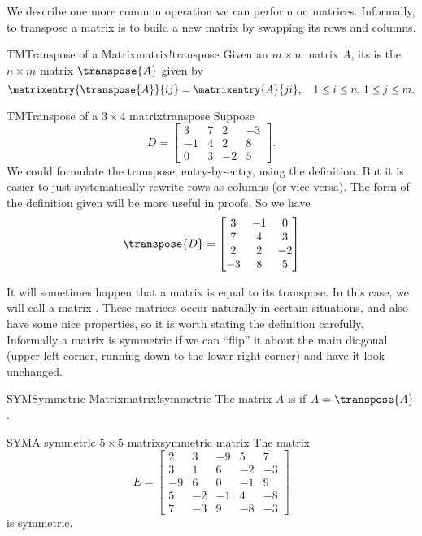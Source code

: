%
%
We describe one more common operation we can perform on matrices.  Informally, to transpose a matrix is to build a new matrix by swapping its rows and columns.
%
\begin{definition}{TM}{Transpose of a Matrix}{matrix!transpose}
Given an $m\times n$ matrix $A$, its  is the $n\times m$ matrix $\transpose{A}$ given by
%
\begin{equation*}
\matrixentry{\transpose{A}}{ij}=\matrixentry{A}{ji},\quad 1\leq i\leq n,\,1\leq j\leq m.
\end{equation*}
%
\end{definition}
%
\begin{example}{TM}{Transpose of a $3\times 4$ matrix}{transpose}
Suppose
%
\begin{equation*}
D=
\begin{bmatrix}
3&7&2&-3\\
-1&4&2&8\\
0&3&-2&5
\end{bmatrix}.
\end{equation*}
%
We could formulate the transpose, entry-by-entry, using the definition.  But it is easier to just systematically rewrite rows as columns (or vice-versa).  The form of the definition given will be more useful in proofs.  So we have
%
\begin{equation*}
\transpose{D}=
\begin{bmatrix}
3&-1&0\\
7&4&3\\
2&2&-2\\
-3&8&5
\end{bmatrix}
\end{equation*}
%
\end{example}
%
It will sometimes happen that a matrix is equal to its transpose.  In this case, we will call a matrix .  These matrices occur naturally in certain situations, and also have some nice properties, so it is worth stating the definition carefully.  Informally a matrix is symmetric if we can ``flip'' it about the main diagonal (upper-left corner, running down to the lower-right corner) and have it look unchanged.
%
\begin{definition}{SYM}{Symmetric Matrix}{matrix!symmetric}
The matrix $A$ is  if $A=\transpose{A}$.
\end{definition}
%
\begin{example}{SYM}{A symmetric $5\times 5$ matrix}{symmetric matrix}
The matrix
%
\begin{equation*}
E=
\begin{bmatrix}
2&3&-9&5&7\\
3&1&6&-2&-3\\
-9&6&0&-1&9\\
5&-2&-1&4&-8\\
7&-3&9&-8&-3
\end{bmatrix}
\end{equation*}
%
is symmetric.
\end{example}
